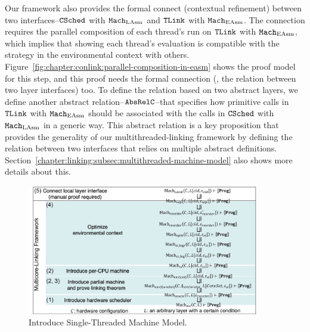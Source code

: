 Our framework also provides 
the formal connect (contextual refinement) between two interfaces--${{\mathrm{\texttt{CSched}}}}$ with ${\mathrm{\texttt{Mach}}}_{\mathrm{LAsm}}$ and ${{\mathrm{\texttt{TLink}}}}$ with ${\mathrm{\texttt{Mach}}}_{\mathrm{EAsm}}$.
The connection requires the parallel composition of each thread's run on ${{\mathrm{\texttt{TLink}}}}$ with ${\mathrm{\texttt{Mach}}}_{\mathrm{EAsm}}$,
which implies that showing each thread's evaluation is compatible with the strategy in the environmental context with others.
Figure~\ref{fig:chapter:conlink:parallel-composition-in-easm} shows the proof model for this step, 
and this proof needs the formal connection (\ie, the relation between two layer interfaces) too. 
To define the relation based on two abstract layers, 
we define another abstract relation--${{\mathrm{\texttt{AbsRelC}}}}$--that specifies how primitive calls in ${{\mathrm{\texttt{TLink}}}}$ with ${\mathrm{\texttt{Mach}}}_{\mathrm{EAsm}}$ 
should be associated with the calls in ${{\mathrm{\texttt{CSched}}}}$ with ${\mathrm{\texttt{Mach}}}_{\mathrm{LAsm}}$ in a generic way. 
This abstract relation is a key proposition that provides the generality of our multithreaded-linking framework by defining the relation between two interfaces that relies on multiple abstract definitions. 
Section~\ref{chapter:linking:subsec:multithreaded-machine-model} also shows more details about this.


\begin{figure}
\begin{center}
\includegraphics[width=0.9\textwidth, page=7]{figs/conlink/concurrent_linking}
\end{center}
\caption{Introduce Single-Threaded Machine Model.}
\label{fig:chapter:conlink:introduce-single-threaded-machine-model-with-iiasm}
\end{figure}

